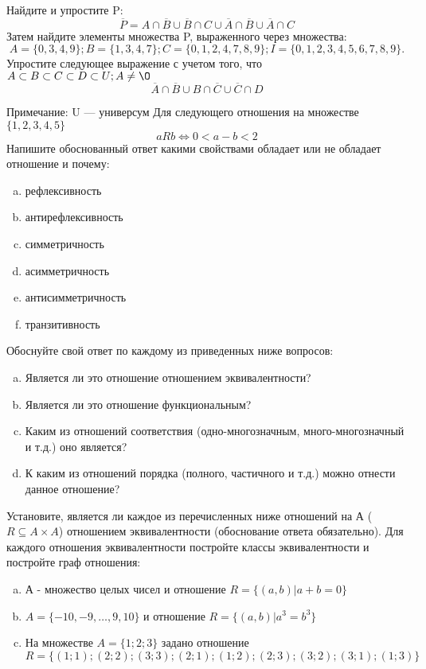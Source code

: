\documentclass[10pt]{exam}
\begin{document}
\begin{questions}
\question
Найдите и упростите P:
\begin{equation*}
\overline{P} = A \cap \overline{B} \cup \overline{B} \cap C \cup \overline{A} \cap \overline{B} \cup \overline{A} \cap C
\end{equation*}
Затем найдите элементы множества P, выраженного через множества:
\begin{equation*}
A = \{0, 3, 4, 9\}; 
B = \{1, 3, 4, 7\};
C = \{0, 1, 2, 4, 7, 8, 9\};
I = \{0, 1, 2, 3, 4, 5, 6, 7, 8, 9\}.
\end{equation*}\question
Упростите следующее выражение с учетом того, что $A\subset B \subset C \subset D \subset U; A \neq \O$
\begin{equation*}
\overline{A} \cap \overline{B} \cup B \cap \overline{C} \cup \overline{C} \cap D
\end{equation*}

Примечание: U — универсум\question
Для следующего отношения на множестве $\{1, 2, 3, 4, 5\}$ 
\begin{equation*}
aRb \iff 0 < a-b<2
\end{equation*}
Напишите обоснованный ответ какими свойствами обладает или не обладает отношение и почему:   
\begin{enumerate} [a)]\setcounter{enumi}{0}
\item рефлексивность
\item антирефлексивность
\item симметричность
\item асимметричность
\item антисимметричность
\item транзитивность
\end{enumerate}

Обоснуйте свой ответ по каждому из приведенных ниже вопросов:
\begin{enumerate} [a)]\setcounter{enumi}{0}
    \item Является ли это отношение отношением эквивалентности?
    \item Является ли это отношение функциональным?
    \item Каким из отношений соответствия (одно-многозначным, много-многозначный и т.д.) оно является?
    \item К каким из отношений порядка (полного, частичного и т.д.) можно отнести данное отношение?
\end{enumerate}
\question
Установите, является ли каждое из перечисленных ниже отношений на А ($R \subseteq A \times A$) отношением эквивалентности (обоснование ответа обязательно). Для каждого отношения эквивалентности 
постройте классы эквивалентности и постройте граф отношения:
\begin{enumerate}[a)]\setcounter{enumi}{0}
\item А - множество целых чисел и отношение $R = \{(a,b)|a + b = 0\}$
\item $A = \{-10, -9, …, 9, 10\}$ и отношение $R = \{(a,b)|a^{3} = b^{3}\}$
\item На множестве $A = \{1; 2; 3\}$ задано отношение $R = \{(1; 1); (2; 2); (3; 3); (2; 1); (1; 2); (2; 3); (3; 2); (3; 1); (1; 3)\}$


\end{enumerate}
\end{questions}
\end{document}
